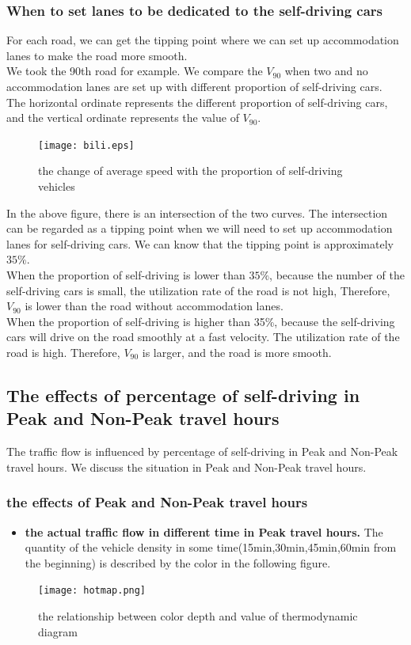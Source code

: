 \documentclass[UTF8]{mcmthesis}
\begin{document}
\subsubsection{When to set lanes to be dedicated to the self-driving cars}
\indent For each road, we can get the tipping point where we can set up accommodation lanes to make the road more smooth.\\
\indent We took the 90th road for example. We compare the $V_{90}$ when two and no accommodation lanes are set up with different proportion of self-driving cars.\\
\indent The horizontal ordinate represents the different proportion of self-driving cars, and the vertical ordinate represents the value of $V_{90}$.\\
\begin{figure}[H]
	\centerline{\texttt{[image: bili.eps]}}
	\caption{the change of average speed with the proportion of self-driving vehicles}	
\end{figure}
\indent In the above figure, there is an intersection of the two curves. The intersection can be regarded as a tipping point when we will need to set up accommodation lanes for self-driving cars. We can know that the tipping point is approximately $35\%$.\\
\indent When the proportion of self-driving is lower than $35\%$, because the number of the self-driving cars is small, the utilization rate of the road is not high, Therefore, $V_{90}$ is lower than the road without accommodation lanes. \\
\indent When the proportion of self-driving is higher than 35\%, because the self-driving cars will drive on the road smoothly at a fast velocity. The utilization rate of the road is high. Therefore, $V_{90}$ is larger, and the road is more smooth.\\
\subsection{The effects of percentage of self-driving in Peak and Non-Peak travel hours}
The traffic flow is influenced by percentage of self-driving in Peak and Non-Peak travel hours. We discuss the situation in Peak and Non-Peak travel hours. 
\subsubsection{the effects of Peak and Non-Peak travel hours}
\begin{itemize}
\item{\textbf{the actual traffic flow in different time in Peak travel hours.} The quantity of the vehicle density in some time(15min,30min,45min,60min from the beginning) is described by the color in the following figure. }
\end{itemize}
\begin{figure}[H]
	\centerline{\texttt{[image: hotmap.png]}}
	\caption{the relationship between color depth and value of thermodynamic diagram}	
\end{figure}
\end{document}
